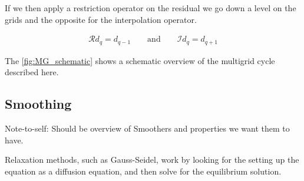 	If we then apply a restriction operator on the residual we go down a level on
	the grids and the opposite for the interpolation operator.

	\begin{align}
		\mathcal{R} d_q = d_{q-1} \qquad \text{and} \qquad \mathcal{I} d_q = d_{q + 1}
	\end{align}

    

    The \cref{fig:MG_schematic} shows a schematic overview of the multigrid cycle described here.



	\subsection{Smoothing}
        Note-to-self: Should be overview of Smoothers and properties we want them to have.

		Relaxation methods, such as Gauss-Seidel, work by looking for the setting up
		the equation as a diffusion equation, and then solve for the equilibrium solution.

